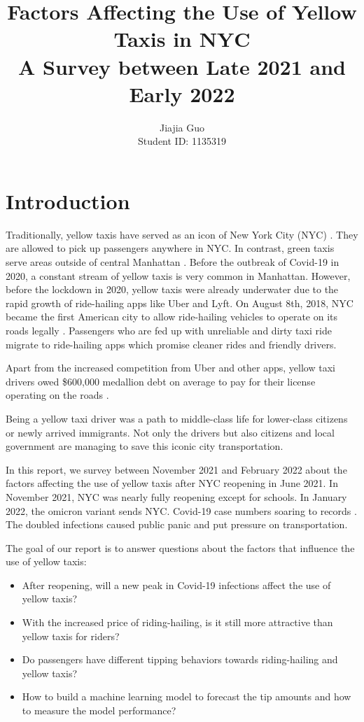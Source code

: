 \documentclass[11pt]{article}
\title{\textbf{Factors Affecting the Use of Yellow Taxis in NYC \\ A Survey between Late 2021 and Early 2022}}
\author{
Jiajia Guo \\
Student ID: 1135319 \\
}
\begin{document}
\maketitle

\section{Introduction}
Traditionally, yellow taxis have served as an icon of New York City (NYC) \cite{medallion}. They are allowed to pick up passengers anywhere in NYC. In contrast, green taxis serve areas outside of central Manhattan \cite{diff}. Before the outbreak of Covid-19 in 2020, a constant stream of yellow taxis is very common in Manhattan. 
However, before the lockdown in 2020, yellow taxis were already underwater due to the rapid growth of ride-hailing apps like Uber and Lyft. On August 8th, 2018, NYC became the first American city to allow ride-hailing vehicles to operate on its roads legally \cite{uber}. Passengers who are fed up with unreliable and dirty taxi ride migrate to ride-hailing apps which promise cleaner rides and friendly drivers.

Apart from the increased competition from Uber and other apps, yellow taxi drivers owed \$600,000 medallion debt on average to pay for their license operating on the roads \cite{medallion}. 

Being a yellow taxi driver was a path to middle-class life for lower-class citizens or newly arrived immigrants. Not only the drivers but also citizens and local government are managing to save this iconic city transportation. 

In this report, we survey between November 2021 and February 2022 about the factors affecting the use of yellow taxis after NYC reopening in June 2021. In November 2021, NYC was nearly fully reopening except for schools. In January 2022, the omicron variant sends NYC. Covid-19 case numbers soaring to records \cite{hit}. The doubled infections caused public panic and put pressure on transportation. 


The goal of our report is to answer questions about the factors that influence the use of yellow taxis:
\begin{itemize}
\item After reopening, will a new peak in Covid-19 infections affect the use of yellow taxis?
\item With the increased price of riding-hailing, is it still more attractive than yellow taxis for riders?
\item Do passengers have different tipping behaviors towards riding-hailing and yellow taxis?
\item How to build a machine learning model to forecast the tip amounts and how to measure the model performance?
\end{itemize}
\end{document}
